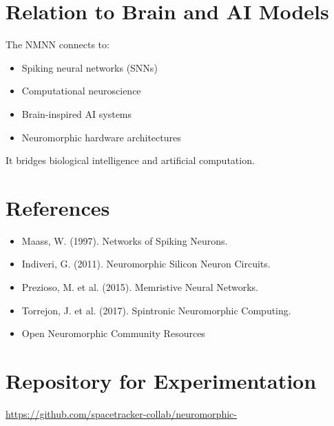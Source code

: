 \documentclass[12pt]{article}
\begin{document}
\section{Relation to Brain and AI Models}

The NMNN connects to:

\begin{itemize}
\item Spiking neural networks (SNNs)
\item Computational neuroscience
\item Brain-inspired AI systems
\item Neuromorphic hardware architectures
\end{itemize}

It bridges biological intelligence and artificial computation.

\section{References}

\begin{itemize}
\item Maass, W. (1997). Networks of Spiking Neurons.
\item Indiveri, G. (2011). Neuromorphic Silicon Neuron Circuits.
\item Prezioso, M. et al. (2015). Memristive Neural Networks.
\item Torrejon, J. et al. (2017). Spintronic Neuromorphic Computing.
\item Open Neuromorphic Community Resources
\end{itemize}

\section{Repository for Experimentation}

\noindent
\url{https://github.com/spacetracker-collab/neuromorphic-}
\end{document}
